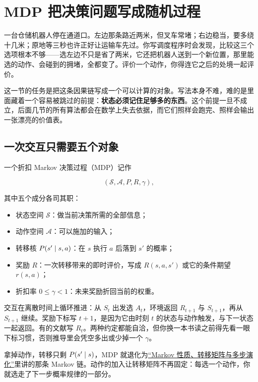 \section{MDP 把决策问题写成随机过程}
\label{sec:16-Control-and-Reinforcement-Learning/02-Reinforcement-Learning/01}

一台仓储机器人停在通道口。左边那条路近两米，但叉车常堵；右边稳当，要多绕十几米；原地等三秒也许正好让运输车先过。你写调度程序时会发现，比较这三个选项根本不够——选左边不只是省了两米，它还把机器人送到一个新位置，那里能选的动作、会碰到的拥堵，全都变了。评价一个动作，你得连它之后的处境一起评价。

这一节的任务是把这条因果链写成一个可以计算的对象。写法本身不难，难的是里面藏着一个容易被跳过的前提：\textbf{状态必须记住足够多的东西}。这个前提一旦不成立，后面几节的所有算法都会在数学上失去依据，而它们照样会跑完、照样会输出一张漂亮的价值表。

\subsection{一次交互只需要五个对象}

一个折扣 Markov 决策过程（MDP）记作

\[
(\mathcal S,\mathcal A,P,R,\gamma),
\]

其中五个成分各司其职：

\begin{itemize}
\tightlist
\item
  状态空间 \(\mathcal S\)：做当前决策所需的全部信息；
\item
  动作空间 \(\mathcal A\)：可以施加的输入；
\item
  转移核 \(P(s'\mid s,a)\)：在 \(s\) 执行 \(a\) 后落到 \(s'\) 的概率；
\item
  奖励 \(R\)：一次转移带来的即时评价，写成 \(R(s,a,s')\) 或它的条件期望 \(r(s,a)\)；
\item
  折扣率 \(0\le\gamma<1\)：未来奖励折回当前的权重。
\end{itemize}

交互在离散时间上循环推进：从 \(S_t\) 出发选 \(A_t\)，环境返回 \(R_{t+1}\) 与 \(S_{t+1}\)，再从 \(S_{t+1}\) 继续。奖励下标写 \(t+1\)，是因为它由时刻 \(t\) 的状态与动作触发，与下一状态一起返回。有的文献写 \(R_t\)。两种约定都能自洽，但你换一本书读之前得先看一眼下标习惯，否则推导里会凭空多出或少掉一个 \(\gamma\)。

拿掉动作，转移只剩 \(P(s'\mid s)\)，MDP 就退化为\hyperref[sec:06-Random-Processes/03-Markov-Chains/01]{``Markov 性质、转移矩阵与多步演化''}里讲的那条 Markov 链。动作的加入让转移矩阵不再固定：每选一个动作，你就选走了下一步概率规律的一部分。

